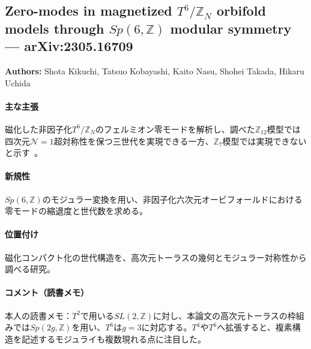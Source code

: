\subsection{Zero-modes in magnetized $T^6/\mathbb{Z}_N$ orbifold models through $Sp(6,\mathbb{Z})$ modular symmetry --- arXiv:2305.16709}

\textbf{Authors:} Shota Kikuchi, Tatsuo Kobayashi, Kaito Nasu, Shohei Takada, Hikaru Uchida

\paragraph{主な主張}
磁化した非因子化$T^6/\mathbb{Z}_N$のフェルミオン零モードを解析し、調べた$\mathbb{Z}_{12}$模型では四次元$\mathcal{N}=1$超対称性を保つ三世代を実現できる一方、$\mathbb{Z}_7$模型では実現できないと示す~\cite{Kikuchi:2023awm}。

\paragraph{新規性}
$Sp(6,\mathbb{Z})$のモジュラー変換を用い、非因子化六次元オービフォールドにおける零モードの縮退度と世代数を求める。

\paragraph{位置付け}
磁化コンパクト化の世代構造を、高次元トーラスの幾何とモジュラー対称性から調べる研究。

\paragraph{コメント（読書メモ）}
本人の読書メモ：$T^2$で用いる$SL(2,\mathbb{Z})$に対し、本論文の高次元トーラスの枠組みでは$Sp(2g,\mathbb{Z})$を用い、$T^6$は$g=3$に対応する。$T^4$や$T^6$へ拡張すると、複素構造を記述するモジュライも複数現れる点に注目した。
